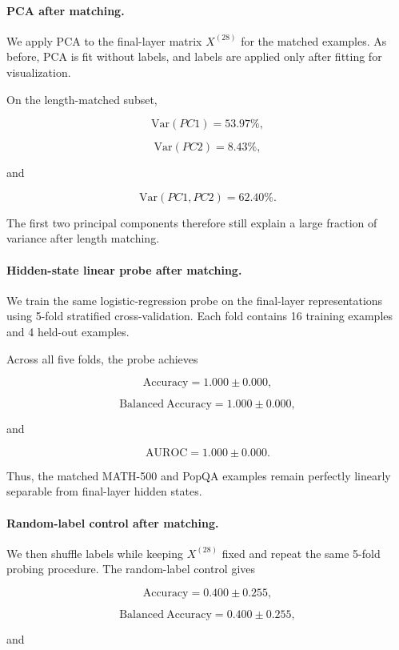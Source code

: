 \documentclass[11pt]{article}
\begin{document}
\paragraph{PCA after matching.}

We apply PCA to the final-layer matrix \(X^{(28)}\) for the matched
examples. As before, PCA is fit without labels, and labels are applied
only after fitting for visualization.

On the length-matched subset,

\[
\mathrm{Var}(PC1)=53.97\%,
\]

\[
\mathrm{Var}(PC2)=8.43\%,
\]

and

\[
\mathrm{Var}(PC1,PC2)=62.40\%.
\]

The first two principal components therefore still explain a large
fraction of variance after length matching.

\paragraph{Hidden-state linear probe after matching.}

We train the same logistic-regression probe on the final-layer
representations using 5-fold stratified cross-validation. Each fold
contains 16 training examples and 4 held-out examples.

Across all five folds, the probe achieves

\[
\mathrm{Accuracy}
=
1.000 \pm 0.000,
\]

\[
\mathrm{Balanced\ Accuracy}
=
1.000 \pm 0.000,
\]

and

\[
\mathrm{AUROC}
=
1.000 \pm 0.000.
\]

Thus, the matched MATH-500 and PopQA examples remain perfectly
linearly separable from final-layer hidden states.

\paragraph{Random-label control after matching.}

We then shuffle labels while keeping \(X^{(28)}\) fixed and repeat the
same 5-fold probing procedure. The random-label control gives

\[
\mathrm{Accuracy}
=
0.400 \pm 0.255,
\]

\[
\mathrm{Balanced\ Accuracy}
=
0.400 \pm 0.255,
\]

and
\end{document}
